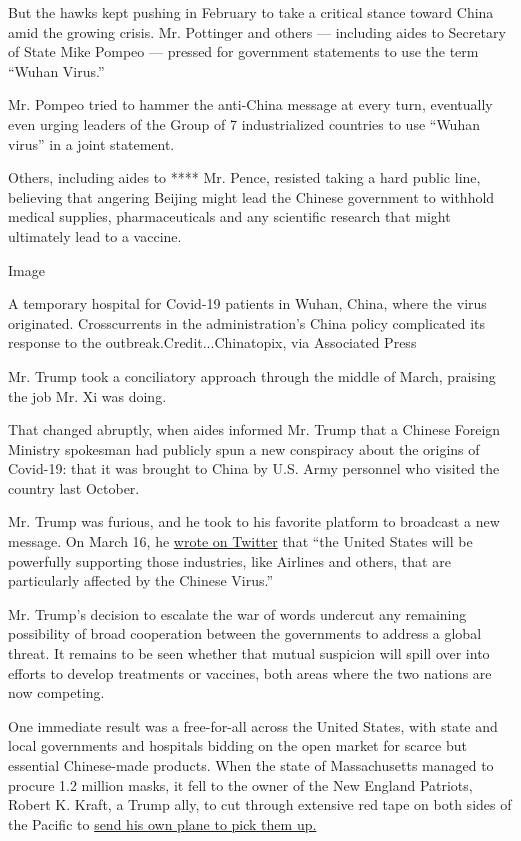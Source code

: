 But the hawks kept pushing in February to take a critical stance toward
China amid the growing crisis. Mr. Pottinger and others --- including
aides to Secretary of State Mike Pompeo --- pressed for government
statements to use the term ``Wuhan Virus.''

Mr. Pompeo tried to hammer the anti-China message at every turn,
eventually even urging leaders of the Group of 7 industrialized
countries to use ``Wuhan virus'' in a joint statement.

Others, including aides to **** Mr. Pence, resisted taking a hard public
line, believing that angering Beijing might lead the Chinese government
to withhold medical supplies, pharmaceuticals and any scientific
research that might ultimately lead to a vaccine.

Image

A temporary hospital for Covid-19 patients in Wuhan, China, where the
virus originated. Crosscurrents in the administration's China policy
complicated its response to the outbreak.Credit...Chinatopix, via
Associated Press

Mr. Trump took a conciliatory approach through the middle of March,
praising the job Mr. Xi was doing.

That changed abruptly, when aides informed Mr. Trump that a Chinese
Foreign Ministry spokesman had publicly spun a new conspiracy about the
origins of Covid-19: that it was brought to China by U.S. Army personnel
who visited the country last October.

Mr. Trump was furious, and he took to his favorite platform to broadcast
a new message. On March 16, he
\href{https://twitter.com/realDonaldTrump/status/1239685852093169664?ref_src=twsrc\%5Etfw\%7Ctwcamp\%5Etweetembed\%7Ctwterm\%5E1239685852093169664\&ref_url=https\%3A\%2F\%2Fwww.bloomberg.com\%2Fnews\%2Farticles\%2F2020-03-17\%2Ftrump-s-chinese-virus-tweet-adds-fuel-to-fire-with-beijing}{wrote
on Twitter} that ``the United States will be powerfully supporting those
industries, like Airlines and others, that are particularly affected by
the Chinese Virus.''

Mr. Trump's decision to escalate the war of words undercut any remaining
possibility of broad cooperation between the governments to address a
global threat. It remains to be seen whether that mutual suspicion will
spill over into efforts to develop treatments or vaccines, both areas
where the two nations are now competing.

One immediate result was a free-for-all across the United States, with
state and local governments and hospitals bidding on the open market for
scarce but essential Chinese-made products. When the state of
Massachusetts managed to procure 1.2 million masks, it fell to the owner
of the New England Patriots, Robert K. Kraft, a Trump ally, to cut
through extensive red tape on both sides of the Pacific to
\href{https://www.nytimes.com/aponline/2020/04/02/sports/football/ap-fbn-patriots-masks-assist.html}{send
his own plane to pick them up.}

